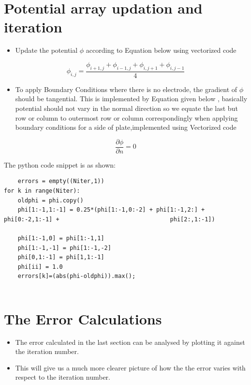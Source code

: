 \documentclass[11pt, a4paper]{article}
\begin{document}
 \section{Potential array updation and iteration}

   \begin{itemize}
   
   \item
    Update the potential \(\phi\) according to Equation below using
     vectorized code
   \end{itemize}
   
   \begin{equation}
           \phi_{i,j} = \frac{\phi_{i+1,j} + \phi_{i-1,j} + \phi_{i,j+1} + \phi_{i,j-1}}{4} 
   \end{equation}
   
   \begin{itemize}
   \item
     To apply Boundary Conditions where there is no electrode, the gradient
     of \(\phi\) should be tangential. This is implemented by Equation
     given below , basically potential should not vary in the normal
     direction so we equate the last but row or column to outermost row or
     column correspondingly when applying boundary conditions for a side of
     plate,implemented using Vectorized code
   \end{itemize}
   
   \begin{equation}
    \frac{\partial \phi}{\partial n} = 0
   \end{equation}
   
   The python code snippet is as shown:

   \begin{verbatim}
    errors = empty((Niter,1))
for k in range(Niter):
    oldphi = phi.copy()
    phi[1:-1,1:-1] = 0.25*(phi[1:-1,0:-2] + phi[1:-1,2:] + phi[0:-2,1:-1] +		                           phi[2:,1:-1])

    phi[1:-1,0] = phi[1:-1,1]
    phi[1:-1,-1] = phi[1:-1,-2]
    phi[0,1:-1] = phi[1,1:-1]
    phi[ii] = 1.0
    errors[k]=(abs(phi-oldphi)).max();
    
         \end{verbatim}
 
 \section{The Error Calculations}  
 \begin{itemize}
 \item
 The error calculated in the last section can be analysed by plotting it against the iteration number.
 \item
 This will give us a much more clearer picture of how the the error varies with respect to the iteration number.
 \end{itemize}
\newpage 
 
\end{document}
